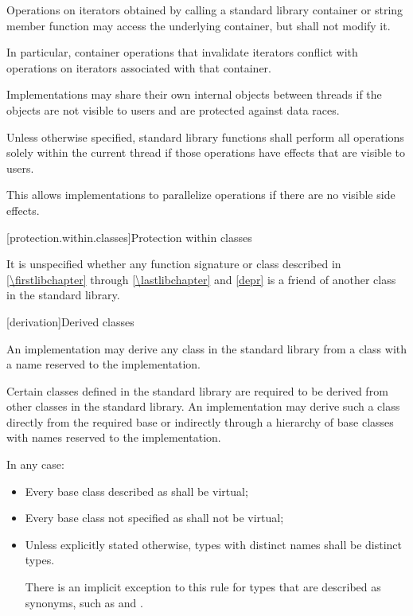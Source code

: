 \pnum
Operations on iterators obtained by calling a standard library container or string
member function may access the underlying container, but shall not modify it.
\begin{note}
In particular, container operations that invalidate iterators conflict
with operations on iterators associated with that container.
\end{note}

\pnum
Implementations may share their own internal objects between threads if the objects are
not visible to users and are protected against data races.

\pnum
Unless otherwise specified, \Cpp{} standard library functions shall perform all operations
solely within the current thread if those operations have effects that are
visible to users.

\pnum
\begin{note}
This allows implementations to parallelize operations if there are no visible
%
side effects.
\end{note}

[protection.within.classes]{Protection within classes}

\pnum
{}%
It is unspecified whether any function signature or class described in
\ref{\firstlibchapter} through \ref{\lastlibchapter} and \ref{depr} is a
friend of another class in the \Cpp{} standard library.

[derivation]{Derived classes}

\pnum
{}%
%
An implementation may derive any class in the \Cpp{} standard library from a class with a
name reserved to the implementation.

\pnum
Certain classes defined in the \Cpp{} standard library are required to be derived from
other classes
in the \Cpp{} standard library.
%
An implementation may derive such a class directly from the required base or indirectly
through a hierarchy of base classes with names reserved to the implementation.

\pnum
In any case:
\begin{itemize}
\item
Every base class described as
shall be virtual;
%
\item
Every base class not specified as
 shall not be virtual;
\item
Unless explicitly stated otherwise, types with distinct names shall be distinct
types.
\begin{note}
There is an implicit exception to this rule for types that are
described as synonyms, such as
 and
.
\end{note}
\end{itemize}

